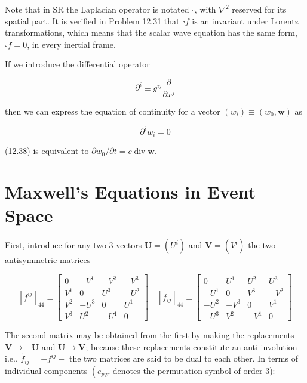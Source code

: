 \documentclass[10pt]{article}
\begin{document}
Note that in SR the Laplacian operator is notated $\square$, with $\nabla^{2}$ reserved for its spatial part. It is verified in Problem 12.31 that $\square f$ is an invariant under Lorentz transformations, which means that the scalar wave equation has the same form, $\square f=0$, in every inertial frame.

If we introduce the differential operator


\begin{equation*}
\partial^{i} \equiv g^{i j} \frac{\partial}{\partial x^{j}} \tag{12.37}
\end{equation*}


then we can express the equation of continuity for a vector $\left(w_{i}\right) \equiv\left(w_{0}, \mathbf{w}\right)$ as


\begin{equation*}
\partial^{i} w_{i}=0 \tag{12.38}
\end{equation*}


(12.38) is equivalent to $\partial w_{0} / \partial t=c \operatorname{div} \mathbf{w}$.

\section*{Maxwell's Equations in Event Space}
First, introduce for any two 3-vectors $\mathbf{U}=\left(U^{i}\right)$ and $\mathbf{V}=\left(V^{i}\right)$ the two antisymmetric matrices

\[
\left[f^{i j}\right]_{44} \equiv\left[\begin{array}{cccc}
0 & -V^{1} & -V^{2} & -V^{3}  \tag{12.39a}\\
V^{1} & 0 & U^{3} & -U^{2} \\
V^{2} & -U^{3} & 0 & U^{1} \\
V^{3} & U^{2} & -U^{1} & 0
\end{array}\right] \quad\left[\tilde{f}_{i j}\right]_{44} \equiv\left[\begin{array}{cccc}
0 & U^{1} & U^{2} & U^{3} \\
-U^{1} & 0 & V^{3} & -V^{2} \\
-U^{2} & -V^{3} & 0 & V^{1} \\
-U^{3} & V^{2} & -V^{1} & 0
\end{array}\right]
\]

The second matrix may be obtained from the first by making the replacements $\mathbf{V} \rightarrow-\mathbf{U}$ and $\mathbf{U} \rightarrow \mathbf{V}$; because these replacements constitute an anti-involution-i.e., $\tilde{f}_{i j}=-f^{i j}-$ the two matrices are said to be dual to each other. In terms of individual components $\left(e_{p q r}\right.$ denotes the permutation symbol of order 3):
\end{document}
